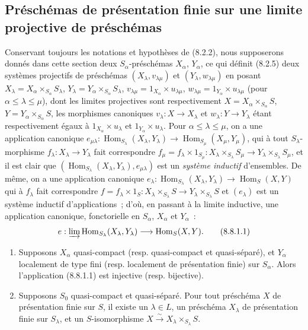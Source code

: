 \subsection{Préschémas de présentation finie sur une limite projective de préschémas}
\label{subsection:IV.8.8-fr}

\begin{env}[8.8.1]
\label{IV.8.8.1-fr}
Conservant toujours les notations et hypothèses de (8.2.2), nous supposerons
donnés dans cette section deux $S_\alpha$-préschémas $X_\alpha$, $Y_\alpha$,
ce qui définit (8.2.5) deux systèmes projectifs de préschémas
$(X_\lambda,v_{\lambda\mu})$ et $(Y_\lambda,w_{\lambda\mu})$ en posant
$X_\lambda=X_\alpha\times_{S_\alpha}S_\lambda$,
$Y_\lambda=Y_\alpha\times_{S_\alpha}S_\lambda$,
$v_{\lambda\mu}=1_{X_\alpha}\times u_{\lambda\mu}$,
$w_{\lambda\mu}=1_{Y_\alpha}\times u_{\lambda\mu}$ (pour
$\alpha\leq\lambda\leq\mu$), dont les limites projectives sont respectivement
$X=X_\alpha\times_{S_\alpha}S$, $Y=Y_\alpha\times_{S_\alpha}S$, les
morphismes canoniques $v_\lambda:X\to X_\lambda$ et
$w_\lambda:Y\to Y_\lambda$ étant respectivement égaux à
$1_{X_\alpha}\times u_\lambda$ et $1_{Y_\alpha}\times u_\lambda$. Pour
$\alpha\leq\lambda\leq\mu$, on a une application canonique
$e_{\mu\lambda}:\operatorname{Hom}_{S_\lambda}(X_\lambda,Y_\lambda)\to
\operatorname{Hom}_{S_\mu}(X_\mu,Y_\mu)$, qui à tout $S_\lambda$-morphisme
$f_\lambda:X_\lambda\to Y_\lambda$ fait correspondre
$f_\mu=f_\lambda\times1_{S_\mu}:X_\lambda\times_{S_\lambda}S_\mu\to
Y_\lambda\times_{S_\lambda}S_\mu$, et il est clair que
$(\operatorname{Hom}_{S_\lambda}(X_\lambda,Y_\lambda),e_{\mu\lambda})$ est un
\emph{système inductif} d'ensembles. De même, on a une application canonique
$e_\lambda:\operatorname{Hom}_{S_\lambda}(X_\lambda,Y_\lambda)\to
\operatorname{Hom}_S(X,Y)$ qui à $f_\lambda$ fait correspondre
$f=f_\lambda\times1_S:X_\lambda\times_{S_\lambda}S\to
Y_\lambda\times_{S_\lambda}S$ et $(e_\lambda)$ est un système inductif
d'applications~; d'où, en passant à la limite inductive, une application
canonique, fonctorielle en $S_\alpha$, $X_\alpha$ et $Y_\alpha$~:
\begin{equation}
e:\varinjlim\operatorname{Hom}_{S_\lambda}(X_\lambda,Y_\lambda)
\longrightarrow\operatorname{Hom}_S(X,Y).
\tag{8.8.1.1}\label{IV.8.8.1.1-fr}
\end{equation}
\end{env}

\begin{theorem}[8.8.2]
\label{IV.8.8.2-fr}
\begin{enumerate}
\item[(i)] Supposons $X_\alpha$ quasi-compact (resp. quasi-compact et
quasi-séparé), et $Y_\alpha$ localement de type fini (resp. localement de
présentation finie) sur $S_\alpha$. Alors l'application (8.8.1.1) est
injective (resp. bijective).
\item[(ii)] Supposons $S_0$ quasi-compact et quasi-séparé. Pour tout préschéma
$X$ de présentation finie sur $S$, il existe un $\lambda\in L$, un préschéma
$X_\lambda$ de présentation finie sur $S_\lambda$, et un $S$-isomorphisme
$X\xrightarrow{\sim}X_\lambda\times_{S_\lambda}S$.
\end{enumerate}
\end{theorem}

